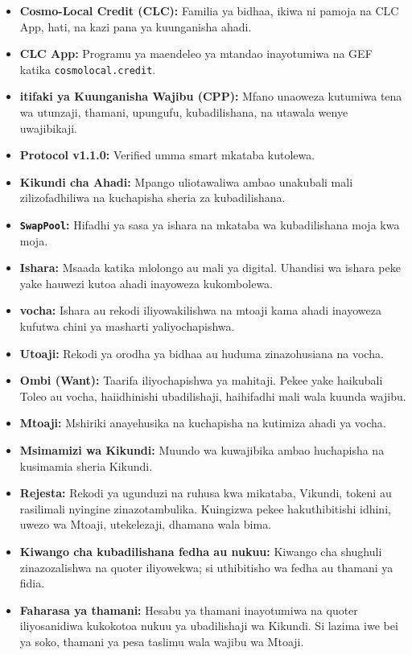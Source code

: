 \documentclass[11pt]{article}
\begin{document}
\begin{itemize}[leftmargin=*]
\item \textbf{Cosmo-Local Credit (CLC):} Familia ya bidhaa, ikiwa ni pamoja na CLC App, hati, na kazi pana ya kuunganisha ahadi.
\item \textbf{CLC App:} Programu ya maendeleo ya mtandao inayotumiwa na GEF katika \texttt{cosmolocal.credit}.
\item \textbf{itifaki ya Kuunganisha Wajibu (CPP):} Mfano unaoweza kutumiwa tena wa utunzaji, thamani, upungufu, kubadilishana, na utawala wenye uwajibikaji.
\item \textbf{Protocol v1.1.0:} Verified umma smart mkataba kutolewa.
\item \textbf{Kikundi cha Ahadi:} Mpango uliotawaliwa ambao unakubali mali zilizofadhiliwa na kuchapisha sheria za kubadilishana.
\item \textbf{\texttt{SwapPool}:} Hifadhi ya sasa ya ishara na mkataba wa kubadilishana moja kwa moja.
\item \textbf{Ishara:} Msaada katika mlolongo au mali ya digital. Uhandisi wa ishara peke yake hauwezi kutoa ahadi inayoweza kukombolewa.
\item \textbf{vocha:} Ishara au rekodi iliyowakilishwa na mtoaji kama ahadi inayoweza kufutwa chini ya masharti yaliyochapishwa.
\item \textbf{Utoaji:} Rekodi ya orodha ya bidhaa au huduma zinazohusiana na vocha.
\item \textbf{Ombi (Want):} Taarifa iliyochapishwa ya mahitaji. Pekee yake haikubali Toleo au vocha, haiidhinishi ubadilishaji, haihifadhi mali wala kuunda wajibu.
\item \textbf{Mtoaji:} Mshiriki anayehusika na kuchapisha na kutimiza ahadi ya vocha.
\item \textbf{Msimamizi wa Kikundi:} Muundo wa kuwajibika ambao huchapisha na kusimamia sheria Kikundi.
\item \textbf{Rejesta:} Rekodi ya ugunduzi na ruhusa kwa mikataba, Vikundi, tokeni au rasilimali nyingine zinazotambulika. Kuingizwa pekee hakuthibitishi idhini, uwezo wa Mtoaji, utekelezaji, dhamana wala bima.
\item \textbf{Kiwango cha kubadilishana fedha au nukuu:} Kiwango cha shughuli zinazozalishwa na quoter iliyowekwa; si uthibitisho wa fedha au thamani ya fidia.
\item \textbf{Faharasa ya thamani:} Hesabu ya thamani inayotumiwa na quoter iliyosanidiwa kukokotoa nukuu ya ubadilishaji wa Kikundi. Si lazima iwe bei ya soko, thamani ya pesa taslimu wala wajibu wa Mtoaji.

\end{itemize}
\end{document}
